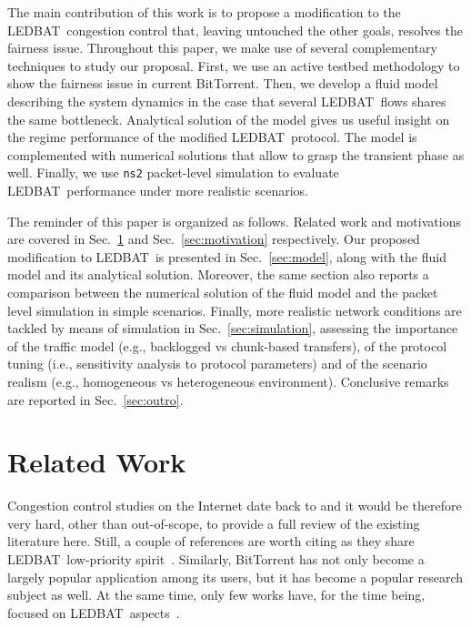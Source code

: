 \documentclass[conference]{IEEEtran}
\newcommand{\secR}[1]{Sec.~\ref{sec:#1}}
\newcommand{\btledbat}[0]{LEDBAT}
\begin{document}
The main contribution of this work is to propose a modification to the \btledbat\ congestion control that, leaving untouched the other goals, resolves the fairness issue.
Throughout this paper, we make use of several complementary techniques to study our proposal. First, we use an active testbed methodology to show the fairness issue in current BitTorrent. Then, we develop a fluid model describing the system dynamics in the case that several \btledbat\ flows shares the same bottleneck. Analytical solution of the model gives us useful insight on the regime performance of the modified \btledbat\ protocol. The model is complemented with numerical solutions that allow to
grasp the transient phase as well. Finally, we use \texttt{ns2} packet-level simulation to evaluate \btledbat\ performance under more realistic scenarios.

The reminder of this paper is organized as follows. Related work and motivations are covered in \secR{related} and \secR{motivation} respectively. Our proposed modification to \btledbat\ is presented in \secR{model}, along with the fluid model and its analytical solution. Moreover, the same section also reports a comparison between the numerical solution of the fluid model and the packet level simulation in simple scenarios. Finally, more realistic network conditions are tackled by means of simulation in \secR{simulation}, assessing the importance of the traffic model (e.g., backlogged vs chunk-based transfers), of the protocol tuning (i.e., sensitivity analysis to protocol parameters) and of the scenario realism (e.g., homogeneous vs heterogeneous environment).  Conclusive remarks are reported in \secR{outro}.


\section{Related Work}\label{sec:related}

Congestion control studies on the Internet date back to \cite{jacobson88tcp} and it would be therefore very hard, other than out-of-scope, to provide a full review of the existing literature here. Still, a couple of references are worth citing as they share \btledbat\ low-priority spirit~\cite{tcp_nice,tcp_lp,tcp_4cp,tcp_key}.
Similarly, BitTorrent has not only become a largely popular application among its users, but it has become a popular research subject as well. At the same time, only few works have, for the time being, focused on \btledbat\  aspects~\cite{cohen10iptps,pam10,icccn10,globecom10,lcn10,gordon2010iccnt}.
\end{document}
